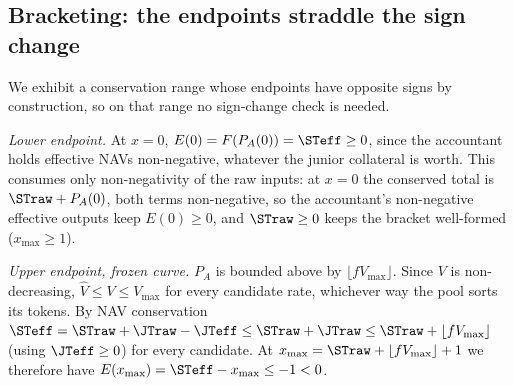 \subsection{Bracketing: the endpoints straddle the sign change}
\label{sec:existence:sign}

We exhibit a conservation range whose endpoints have opposite signs by
construction, so on that range no sign-change check is needed.

\emph{Lower endpoint.} At $x = 0$, $E(0) = F(P_A(0)) = \STeff \geq 0$,
since the accountant holds effective NAVs non-negative, whatever the
junior collateral is worth. This consumes only non-negativity of the
raw inputs: at $x = 0$ the conserved total is $\STraw + P_A(0)$, both
terms non-negative, so the accountant's non-negative effective outputs
keep $E(0) \geq 0$, and $\STraw \geq 0$ keeps the bracket well-formed
($x_{\max} \geq 1$).

\emph{Upper endpoint, frozen curve.} $P_A$ is bounded above by
$\lfloor f V_{\max}\rfloor$. Since $V$ is non-decreasing,
$\widehat V \leq V \leq V_{\max}$ for every candidate rate, whichever way
the pool sorts its tokens. By NAV conservation
$\STeff = \STraw + \JTraw - \JTeff \leq \STraw + \JTraw \leq \STraw +
\lfloor f V_{\max}\rfloor$ (using $\JTeff \geq 0$) for every candidate.
At $x_{\max} = \STraw + \lfloor f V_{\max}\rfloor + 1$ we therefore have
$E(x_{\max}) = \STeff - x_{\max} \leq -1 < 0$.


